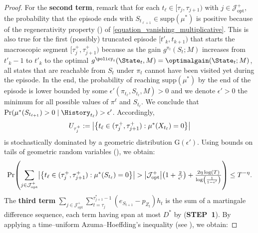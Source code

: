 \documentclass[preprint,cleveref,12pt]{colt2025}
\DeclarePairedDelimiter{\braces}{\{}{\}}	%
\DeclarePairedDelimiter{\parens}{(}{)}	%
\DeclarePairedDelimiter{\abs}{\lvert}{\rvert}	%
\def\optgain{\optimalgain} %
\def\STEP#1{(\strong{STEP~#1})}
\newcommand{\strong}[1]{\textbf{#1}}
\begin{document}
\begin{proof}
        For the \strong{second term}, remark that for each $t_\ell \in [\tau_j, \tau_{j+1})$ with $j \in \mathcal{J}^+_\mathrm{opt}$, the probability that the episode ends with $S_{t_{\ell+1}} \in \mathrm{supp}(\mu^*)$ is positive because of the regenerativity property () of \eqref{equation_vanishing_multiplicative}.
        This is also true for the first (possibly) truncated episode $[t'_k, t_{k+1})$ that starts the macroscopic segment $[\tau_j^+, \tau_{j+1}^+)$ because as the gain $g^{\pi_{t}}(S_t; M)$ increases from $t'_k-1$ to $t'_k$ to the optimal $g^{\policy_t}(\State_t, M) = \optgain(\State_t; M)$, all states that are reachable from $S_t$ under $\pi_t$ cannot have been visited yet during the episode.
        In the end, the probability of reaching $\mathrm{supp}(\mu^*)$ by the end of the episode is lower bounded by some $\epsilon'(\pi_{t_\ell}, S_{t_\ell}, M) > 0$ and we denote $\epsilon' > 0$ the minimum for all possible values of $\pi^\ell$ and $S_{t_\ell}$.
        We conclude that $\Pr(\mu^*(S_{t_{\ell+1}}) > 0 \mid \History_{t_\ell}) > \epsilon'$. 
        Accordingly,
        \begin{equation*}
            U_{\tau_j^+}
            :=
            \abs*{\braces*{
                t_\ell \in (\tau_j^+, \tau_{j+1}^+)
                :
                \mu^*(X_{t_\ell})
                =
                0
            }}
        \end{equation*}
        is stochastically dominated by a geometric distribution $\mathrm{G}(\epsilon')$. 
        Using bounds on tails of geometric random variables (), we obtain:
        \begin{equation}
            \label{equation_coherence_optimal_segments_2}
            \Pr\parens*{
                \sum_{j \in \mathcal{J}^+_\mathrm{opt}}
                \abs*{\braces*{
                    t_\ell \in (\tau_j^+, \tau_{j+1}^+) : \mu^*(S_{t_\ell}) = 0
                }}
                >
                \abs*{\mathcal{J}^+_\mathrm{opt}} \parens*{1 + \tfrac 2{\epsilon'}}
                + \tfrac{2\eta \log(T)}{\log\parens*{\frac 1{1-\epsilon'}}}
            }
            \le
            T^{-\eta}
            .
        \end{equation}
        The \strong{third term} $\sum_{j \in \mathcal{J}^+_\mathrm{opt}} \sum_{t=\tau_j}^{\tau_{j+1}^*-1} (e_{S_{t+1}} - p_{Z_t}) h_t$ is the sum of a martingale difference sequence, each term having span at most $D^*$ by \STEP{1}.
        By applying a time--uniform Azuma--Hoeffding's inequality (see \cite[Lemma~5]{bourel_tightening_2020}), we obtain:

\end{proof}
\end{document}
